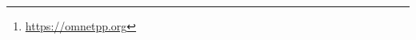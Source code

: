 \begin{abstract}
	This project has been developed as a workgroup for the course of
	\theclass{} (\thecourse, \theinstitute). The aim of this project is to
	give a demonstration of the students' capabilities to build up a
	simulator with \omnetpp\footnote{\url{https://omnetpp.org}} for the
	\thetitle{} problem defined in  and analyze the results
	in order to optimize the performance of the network.
\end{abstract}
